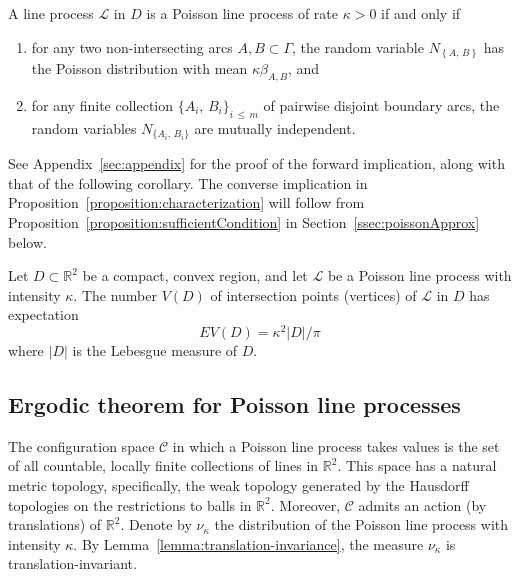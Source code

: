 \documentclass[10pt]{amsart}
\theoremstyle{definition}\newtheorem{defi}[theo]{Definition}\newtheorem{rema}[theo]{Remark}\newtheorem{exam}[theo]{Example}\newtheorem{exem}[theo]{Example}\newtheorem{nota}[theo]{Notation}
\newcommand{\xset}[1]{\left\{ #1 \right\}}
\newcommand{\zz}[1]{\mathbb #1}
\newcommand*{\romanenumi}{\renewcommand*{\theenumi}{\roman{enumi}}}
\begin{document}
\goodbreak
\begin{prop}\label{proposition:characterization}
A line process $\mathcal{L}$ in $D$ is a Poisson line process of rate $\kappa >0$ if and only if
\begin{enumerate}\romanenumi
\item \label{list2.5.1}for any two non-intersecting arcs $A,B \subset \Gamma$, the random variable $N_{\xset {A,\,B}}$ has the Poisson distribution with mean $\kappa \beta_{A,B}$, and
\item \label{list2.5.2}for any finite collection $\{A_{i},\,B_{i} \}_{i\,\leq\,m}$ of pairwise disjoint boundary arcs, the random variables $N_{\{A_{i},\,B_{i}\}}$ are mutually independent.
\end{enumerate}
\end{prop}

See Appendix~\ref{sec:appendix} for the proof of the forward implication, along with that of the following corollary. The converse implication in Proposition~\ref{proposition:characterization} will follow from Proposition~\ref{proposition:sufficientCondition} in Section~\ref{ssec:poissonApprox} below.


\begin{coro}\label{corollary:ppIntensity}
Let $D\subset \zz{R}^{2}$ be a compact, convex region, and let $\mathcal{L}$ be a Poisson line process with intensity $\kappa$. The number $V(D)$ of intersection points (vertices) of $\mathcal{L}$ in $D$ has expectation
\[
EV (D)=\kappa^{2} |D|/\pi
\]
where $|D|$ is the Lebesgue measure of $D$.
\end{coro}



\subsection{Ergodic theorem for Poisson line processes}\label{ssec:erg-theorem-plp}

The configuration space $\mathcal{C}$ in which a Poisson line process takes values is the set of all countable, locally finite collections of lines in $\zz{R}^{2}$. This space has a natural metric topology, specifically, the weak topology generated by the Hausdorff topologies on the restrictions to balls in $\zz{R}^{2}$. Moreover, $\mathcal{C}$ admits an action (by translations) of $\zz{R}^{2}$. Denote by $\nu_{\kappa}$ the distribution of the Poisson line process with intensity $\kappa$. By Lemma~\ref{lemma:translation-invariance}, the measure $\nu_{\kappa}$ is translation-invariant.
\end{document}
